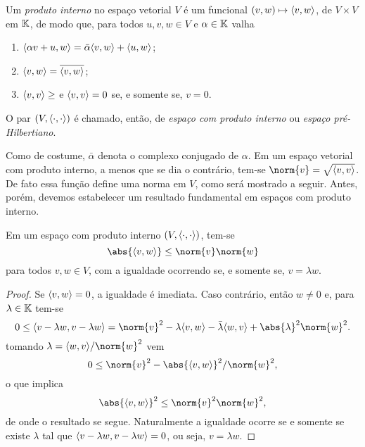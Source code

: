 \begin{defn}
    Um \emph{produto interno} no espaço vetorial \( V \) é um funcional \( (v, w) \mapsto \langle v,w\rangle \), de \( V \times V \) em \( \mathbb{K} \), de modo que, para todos \( u, v, w \in V \) e \( \alpha \in \mathbb{K} \) valha
    \begin{enumerate}[label=(\roman*)]
        \item \( \langle\alpha v + u, w\rangle = \bar{\alpha} \langle v, w\rangle + \langle u, w\rangle \);
        \item \( \langle v, w\rangle = \overline{\langle v,w\rangle} \);
        \item \( \langle v, v\rangle \geq \) e \( \langle v, v\rangle = 0 \) se, e somente se, \( v = 0 \).
    \end{enumerate}
    O par \( (V, \langle\cdot,\cdot\rangle) \) é chamado, então, de \emph{espaço com produto interno} ou \emph{espaço pré-Hilbertiano}.
\end{defn}
Como de costume, \( \bar{\alpha} \) denota o complexo conjugado de \( \alpha \).
Em um espaço vetorial com produto interno, a menos que se dia o contrário, tem-se \( \norm{ v } = \sqrt{ \dotprod{v,v} } \).
De fato essa função define uma norma em \( V \), como será mostrado a seguir.
Antes, porém, devemos estabelecer um resultado fundamental em espaços com produto interno.
\begin{teo}
    Em um espaço com produto interno \( (V, \langle\cdot,\cdot\rangle) \), tem-se \[
        \abs{ \dotprod{v, w} } \leq \norm{ v } \norm{ w }
    \]
    para todos \( v, w \in V \), com a igualdade ocorrendo se, e somente se, \( v = \lambda w \).
\end{teo}
\begin{proof}
    Se \( \langle v, w\rangle = 0 \), a igualdade é imediata.
    Caso contrário, então \( w \neq 0 \) e, para \( \lambda \in \mathbb{K} \) tem-se \[
        0 \leq \dotprod{v - \lambda w, v - \lambda w} = \norm{ v }^2 -\lambda \dotprod{v, w} -\bar{\lambda} \dotprod{w, v} + \abs{ \lambda }^2 \norm{ w }^2
    .\]
    tomando \( \lambda = \dotprod{w, v}/\norm{ w }^2 \) vem \[
        0 \leq \norm{ v }^2 - \abs{ \dotprod{v, w} }^2/ \norm{ w }^2
    ,\]
    o que implica \[
        \abs{ \dotprod{v, w} }^2 \leq \norm{ v }^2 \norm{ w }^2
    ,\]
    de onde o resultado se segue.
    Naturalmente a igualdade ocorre se e somente se existe \( \lambda \) tal que \( \langle v - \lambda w, v - \lambda w\rangle = 0 \), ou seja, \( v = \lambda w \).
\end{proof}

